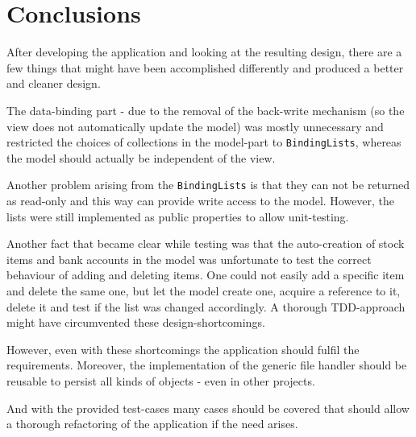 \chapter{Conclusions}\label{ch:conclusions} %

After developing the application and looking at the resulting design, there are a few things that might have been accomplished differently and produced a better and cleaner design.

The data-binding part - due to the removal of the back-write mechanism (so the view does not automatically update the model) was mostly unnecessary and restricted the choices of collections in the model-part to \texttt{BindingLists}, whereas the model should actually be independent of the view.

Another problem arising from the \texttt{BindingLists} is that they can not be returned as read-only and this way can provide write access to the model. However, the lists were still implemented as public properties to allow unit-testing.

Another fact that became clear while testing was that the auto-creation of stock items and bank accounts in the model was unfortunate to test the correct behaviour of adding and deleting items. One could not easily add a specific item and delete the same one, but let the model create one, acquire a reference to it, delete it and test if the list was changed accordingly. A thorough \ac{TDD}-approach might have circumvented these design-shortcomings.

However, even with these shortcomings the application should fulfil the requirements.
Moreover, the implementation of the generic file handler should be reusable to persist all kinds of objects - even in other projects.

And with the provided test-cases many cases should be covered that should allow a thorough refactoring of the application if the need arises.